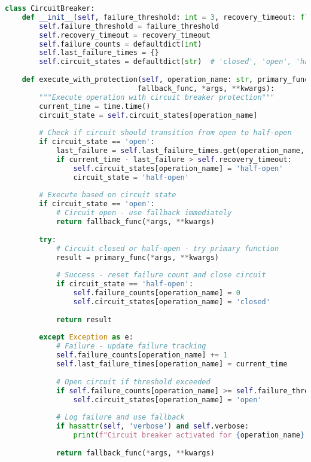 \begin{lstlisting}[language=Python, caption=Circuit Breaker Implementation for Graph Operations]
class CircuitBreaker:
    def __init__(self, failure_threshold: int = 3, recovery_timeout: float = 30.0):
        self.failure_threshold = failure_threshold
        self.recovery_timeout = recovery_timeout
        self.failure_counts = defaultdict(int)
        self.last_failure_times = {}
        self.circuit_states = defaultdict(str)  # 'closed', 'open', 'half-open'
    
    def execute_with_protection(self, operation_name: str, primary_func, 
                               fallback_func, *args, **kwargs):
        """Execute operation with circuit breaker protection"""
        current_time = time.time()
        circuit_state = self.circuit_states[operation_name]
        
        # Check if circuit should transition from open to half-open
        if circuit_state == 'open':
            last_failure = self.last_failure_times.get(operation_name, 0)
            if current_time - last_failure > self.recovery_timeout:
                self.circuit_states[operation_name] = 'half-open'
                circuit_state = 'half-open'
        
        # Execute based on circuit state
        if circuit_state == 'open':
            # Circuit open - use fallback immediately
            return fallback_func(*args, **kwargs)
        
        try:
            # Circuit closed or half-open - try primary function
            result = primary_func(*args, **kwargs)
            
            # Success - reset failure count and close circuit
            if circuit_state == 'half-open':
                self.failure_counts[operation_name] = 0
                self.circuit_states[operation_name] = 'closed'
            
            return result
            
        except Exception as e:
            # Failure - update failure tracking
            self.failure_counts[operation_name] += 1
            self.last_failure_times[operation_name] = current_time
            
            # Open circuit if threshold exceeded
            if self.failure_counts[operation_name] >= self.failure_threshold:
                self.circuit_states[operation_name] = 'open'
            
            # Log failure and use fallback
            if hasattr(self, 'verbose') and self.verbose:
                print(f"Circuit breaker activated for {operation_name}: {str(e)}")
            
            return fallback_func(*args, **kwargs)
\end{lstlisting}

